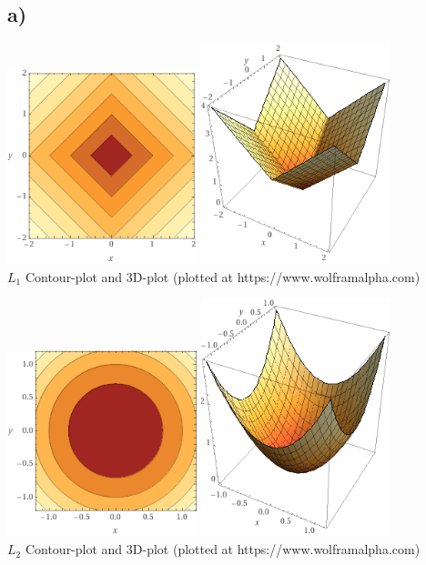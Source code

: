 \documentclass[a4paper]{article}
\begin{document}
    \subsection*{a)}
        \begin{center}
            \includegraphics[width=55mm]{Assignment 7/L1(2).png}
            \includegraphics[width=55mm]{Assignment 7/L1(1).png}\\
            \caption{$L_1$ Contour-plot and 3D-plot (plotted at https://www.wolframalpha.com)}
        \end{center}
        \begin{center}
            \includegraphics[width=55mm]{Assignment 7/L2(2).png}
            \includegraphics[width=55mm]{Assignment 7/L2(1).png}\\
            \caption{$L_2$ Contour-plot and 3D-plot (plotted at https://www.wolframalpha.com)}
        \end{center}
\end{document}
